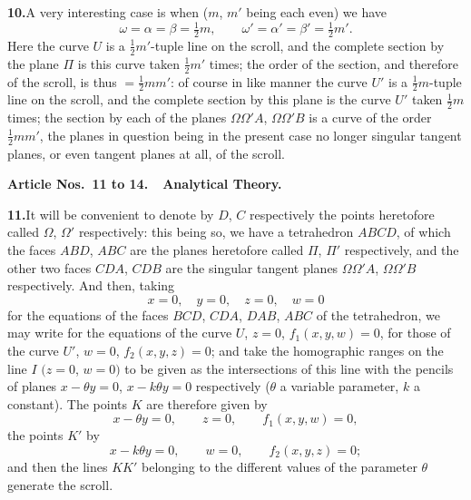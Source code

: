 \documentclass[11pt,a4paper]{article}
\begin{document}
\textbf{10.}\quad A very interesting case is when ($m$, $m'$ being each even)
we have
\[
\omega = \alpha = \beta = \tfrac{1}{2}m, \qquad
\omega' = \alpha' = \beta' = \tfrac{1}{2}m'.
\]
Here the curve $U$ is a $\tfrac{1}{2}m'$-tuple line on the scroll, and the
complete section by the plane $\Pi$ is this curve taken $\tfrac{1}{2}m'$ times;
the order of the section, and therefore of the scroll, is thus $= \tfrac{1}{2}m m'$:
of course in like manner the curve $U'$ is a $\tfrac{1}{2}m$-tuple line on the
scroll, and the complete section by this plane is the curve $U'$ taken
$\tfrac{1}{2}m$ times; the section by each of the planes $\Omega\Omega'\!A$,
$\Omega\Omega'\!B$ is a curve of the order $\tfrac{1}{2}m m'$, the planes in
question being in the present case no longer singular tangent planes, or even
tangent planes at all, of the scroll.

\medskip
\noindent\textbf{Article Nos.~11 to 14.\ \ Analytical Theory.}
\medskip

\textbf{11.}\quad It will be convenient to denote by $D$, $C$ respectively the
points heretofore called $\Omega$, $\Omega'$ respectively: this being so, we
have a tetrahedron $ABCD$, of which the faces $ABD$, $ABC$ are the planes
heretofore called $\Pi$, $\Pi'$ respectively, and the other two faces $CDA$,
$CDB$ are the singular tangent planes $\Omega\Omega'\!A$, $\Omega\Omega'\!B$
respectively. And then, taking
\[
x = 0, \quad y = 0, \quad z = 0, \quad w = 0
\]
for the equations of the faces $BCD$, $CDA$, $DAB$, $ABC$ of the tetrahedron,
we may write for the equations of the curve $U$, $z = 0$, $f_{1}(x, y, w) = 0$,
for those of the curve $U'$, $w = 0$, $f_{2}(x, y, z) = 0$; and take the
homographic ranges on the line $I$ $(z = 0$, $w = 0)$ to be given as the
intersections of this line with the pencils of planes $x - \theta y = 0$,
$x - k\theta y = 0$ respectively ($\theta$ a variable parameter, $k$ a
constant). The points $K$ are therefore given by
\[
x - \theta y = 0, \qquad z = 0, \qquad f_{1}(x, y, w) = 0,
\]
the points $K'$ by
\[
x - k\theta y = 0, \qquad w = 0, \qquad f_{2}(x, y, z) = 0;
\]
and then the lines $KK'$ belonging to the different values of the parameter
$\theta$ generate the scroll.
\end{document}
